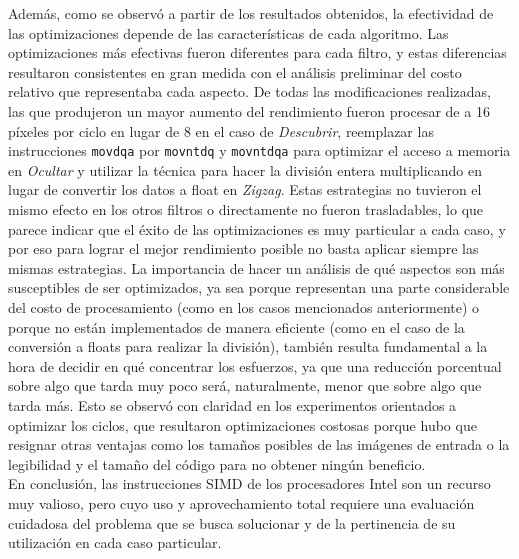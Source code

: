 \documentclass[a4paper]{article}
\begin{document}
Además, como se observó a partir de los resultados obtenidos, la efectividad de las optimizaciones depende de las características de cada algoritmo. Las optimizaciones más efectivas fueron diferentes para cada filtro, y estas diferencias resultaron consistentes en gran medida con el análisis preliminar del costo relativo que representaba cada aspecto. De todas las modificaciones realizadas, las que produjeron un mayor aumento del rendimiento fueron procesar de a 16 píxeles por ciclo en lugar de 8 en el caso de \textit{Descubrir}, reemplazar las instrucciones {\tt movdqa} por {\tt movntdq} y {\tt movntdqa} para optimizar el acceso a memoria en \textit{Ocultar} y utilizar la técnica para hacer la división entera multiplicando en lugar de convertir los datos a float en \textit{Zigzag}. Estas estrategias no tuvieron el mismo efecto en los otros filtros o directamente no fueron trasladables, lo que parece indicar que el éxito de las optimizaciones es muy particular a cada caso, y por eso para lograr el mejor rendimiento posible no basta aplicar siempre las mismas estrategias. La importancia de hacer un análisis de qué aspectos son más susceptibles de ser optimizados, ya sea porque representan una parte considerable del costo de procesamiento (como en los casos mencionados anteriormente) o porque no están implementados de manera eficiente (como en el caso de la conversión a floats para realizar la división), también resulta fundamental a la hora de decidir en qué concentrar los esfuerzos, ya que una reducción porcentual sobre algo que tarda muy poco será, naturalmente, menor que sobre algo que tarda más. Esto se observó con claridad en los experimentos orientados a optimizar los ciclos, que resultaron optimizaciones costosas porque hubo que resignar otras ventajas como los tamaños posibles de las imágenes de entrada o la legibilidad y el tamaño del código para no obtener ningún beneficio. \\
En conclusión, las instrucciones SIMD de los procesadores Intel son un recurso muy valioso, pero cuyo uso y aprovechamiento total requiere una evaluación cuidadosa del problema que se busca solucionar y de la pertinencia de su utilización en cada caso particular.
\end{document}
